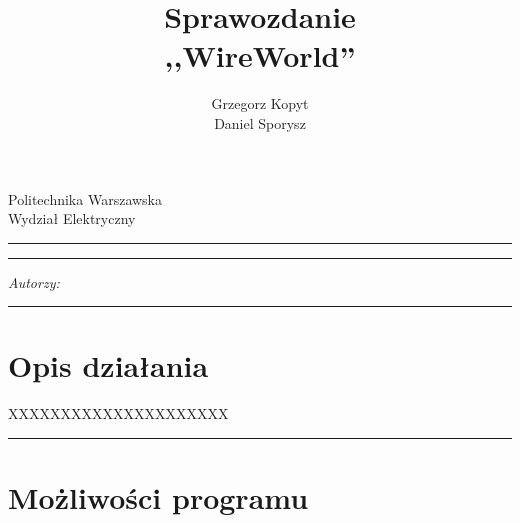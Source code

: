 \documentclass[a4paper,11pt]{article}
\author{Grzegorz Kopyt\\
Daniel Sporysz}
\title{Sprawozdanie\\
,,WireWorld''}
\makeatletter
\newcommand{\linia}{\rule{\linewidth}{0.4mm}}
\renewcommand{\maketitle}{\begin{titlepage}
    \vspace*{2cm}
    \begin{center}\LARGE
    Politechnika Warszawska\\
    Wydział Elektryczny\\
    \end{center}
    \vspace{5cm}
    \noindent\linia
    \begin{center}
      \LARGE \textsc{\@title}
         \end{center}
     \linia
    \vspace{0.5cm}
    \begin{flushright}
    \begin{minipage}{5cm}
    \textit{Autorzy:}\\
    \normalsize \textsc{\@author} \par
    \end{minipage}
    \vspace{5cm}
     \end{flushright}
    \vspace*{\stretch{6}}
    \begin{center}
    \@date
    \end{center}
  \end{titlepage}%
}
\makeatother
\begin{document}
\maketitle


\tableofcontents
\vspace{1cm}
\noindent\linia



\section{Opis działania}
XXXXXXXXXXXXXXXXXXXXX

\noindent\linia
\section{Możliwości programu}
\end{document}
